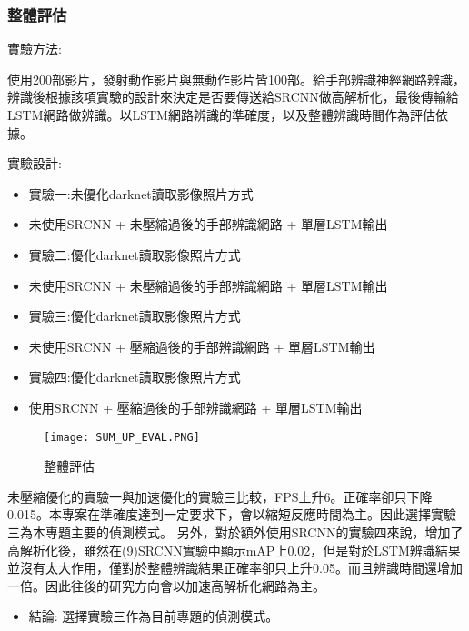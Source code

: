 \subsubsection{整體評估}
實驗方法:

使用200部影片，發射動作影片與無動作影片皆100部。給手部辨識神經網路辨識，辨識後根據該項實驗的設計來決定是否要傳送給SRCNN做高解析化，最後傳輸給LSTM網路做辨識。以LSTM網路辨識的準確度，以及整體辨識時間作為評估依據。

實驗設計:
\begin{itemize}
\item 實驗一:未優化darknet讀取影像照片方式
\item 未使用SRCNN + 未壓縮過後的手部辨識網路 + 單層LSTM輸出
\item 實驗二:優化darknet讀取影像照片方式
\item 未使用SRCNN + 未壓縮過後的手部辨識網路 + 單層LSTM輸出
\item 實驗三:優化darknet讀取影像照片方式
\item 未使用SRCNN + 壓縮過後的手部辨識網路 + 單層LSTM輸出
\item 實驗四:優化darknet讀取影像照片方式
\item 使用SRCNN + 壓縮過後的手部辨識網路 + 單層LSTM輸出
\end{itemize}

\begin{figure}[H]
    \centering
    \texttt{[image: SUM\_UP\_EVAL.PNG]}
    \caption{整體評估}
    \label{fig:整體評估}
\end{figure}


未壓縮優化的實驗一與加速優化的實驗三比較，FPS上升6。正確率卻只下降0.015。本專案在準確度達到一定要求下，會以縮短反應時間為主。因此選擇實驗三為本專題主要的偵測模式。
另外，對於額外使用SRCNN的實驗四來說，增加了高解析化後，雖然在(9)SRCNN實驗中顯示mAP上0.02，但是對於LSTM辨識結果並沒有太大作用，僅對於整體辨識結果正確率卻只上升0.05。而且辨識時間還增加一倍。因此往後的研究方向會以加速高解析化網路為主。

\begin{itemize}
\item 結論: 選擇實驗三作為目前專題的偵測模式。
\end{itemize}
